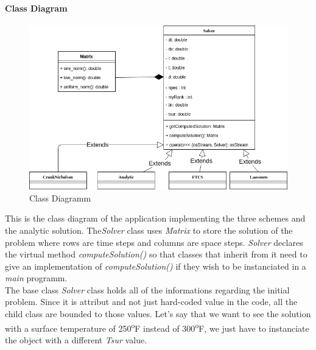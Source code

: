 \documentclass[12pt, a4paper]{report}
\begin{document}
\paragraph{Class Diagram}
\begin{figure}[h]
\centering
\includegraphics[scale=0.5]{report/ClassDiagram.png}
\caption{Class Diagramm}
\end{figure}

This is the class diagram of the application implementing the three schemes and the analytic solution.  The\textit{Solver} class uses \textit{Matrix} to store the solution of the problem where rows are time steps and columns are space steps. \textit{Solver} declares the virtual method \textit{computeSolution()} so that classes that inherit from it need to give an implementation of \textit{computeSolution()} if they wish to be instanciated in a \textit{main} programm.\\
The base class \textit{Solver} class holds all of the informations regarding the initial problem. Since it is attribut and not just hard-coded value in the code, all the child class are bounded to those values. Let's say that we want to see the solution with a surface temperature of 250\textsuperscript{o}F instead of 300\textsuperscript{o}F, we just have to instanciate the object with a different \textit{Tsur} value.
\end{document}
